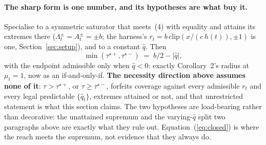 \paragraph{The sharp form is one number, and its hypotheses are what buy it.} Specialise to a
symmetric saturator that meets~(4) with equality and attains its extremes there
($\Lambda^{\pm}_t = A^{\pm}_t = \pm b$; the harness's $r_t = b\,\mathrm{clip}(x/(c\,h(t)),\pm 1)$ is
one, Section~\ref{sec:setup}), and to a constant $\hat{q}$. Then
\begin{equation}
  \min(\tau^{\star+},\tau^{\star-}) \;=\; b/2 - |\hat{q}| ,
  \label{eq:closed}
\end{equation}
with the endpoint admissible only when $\hat{q} < 0$: exactly Corollary~2's radius at $\mu_t = 1$,
now as an if-and-only-if. \textbf{The necessity direction above assumes none of it}: $\tau >
\tau^{\star+}$, or $\tau \ge \tau^{\star-}$, forfeits coverage against every admissible $r_t$ and
every legal predictable $\{\hat{q}_t\}$, extremes attained or not, and that unrestricted statement
is what this section claims. The two hypotheses are load-bearing rather than decorative: the
unattained supremum and the varying-$\hat{q}$ split two paragraphs above are exactly what they
rule out. Equation~(\ref{eq:closed}) is where the reach meets the supremum, not evidence that they
always do.

